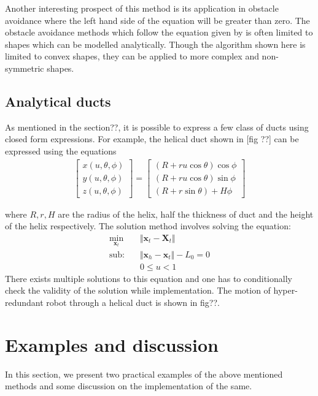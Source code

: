 \documentclass[12pt,a4]{article}
\begin{document}
Another interesting prospect of this method is its application in obstacle avoidance where the left hand side of the equation  will be greater than zero. The obstacle avoidance methods which follow the equation given by  is often limited to shapes which can be modelled analytically. Though the algorithm shown here is limited to convex shapes, they can be applied to more complex and non-symmetric shapes.

\subsection{Analytical ducts}
As mentioned in the section??, it is possible to express a few class of ducts using closed form expressions. For example, the helical duct shown in [fig ??] can be expressed using the equations
\begin{align}
\begin{bmatrix}
x(u,\theta,\phi)\\y(u,\theta,\phi)\\z(u,\theta,\phi)
\end{bmatrix} = 
\begin{bmatrix}
\left(R+ru\cos\theta \right)\cos\phi\\
\left(R+ru\cos\theta \right)\sin\phi\\
\left(R+r\sin\theta \right)+H\phi
\end{bmatrix}
\end{align}

where $R,r,H$ are the radius of the helix, half the thickness of duct and the height of the helix respectively. The solution method involves solving the equation:
\begin{align}
\label{eq:analy2D}
\min_{\textbf{x}_t} &\Vert \textbf{x}_t-\textbf{X}_t \Vert\\
\nonumber \text{sub:~~~} &\Vert \textbf{x}_h - \textbf{x}_t \Vert -L_0 = 0\\
&0\leq u < 1
\end{align} 
There exists multiple solutions to this equation and one has to conditionally check the validity of the solution while implementation. The motion of hyper-redundant robot through a helical duct is shown in fig??.

\section{Examples and discussion}
In this section, we present two practical examples of the above mentioned methods and some discussion  on the implementation of the same.
\end{document}
